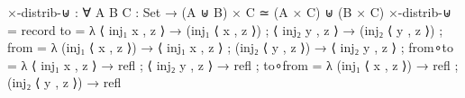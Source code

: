 \documentclass{lecturenotes}
\begin{document}
\begin{code}
×-distrib-⊎ : ∀ {A B C : Set} → (A ⊎ B) × C ≃ (A × C) ⊎ (B × C)
×-distrib-⊎ =
  record
    { to      = λ{ ⟨ inj₁ x , z ⟩ → (inj₁ ⟨ x , z ⟩)
                 ; ⟨ inj₂ y , z ⟩ → (inj₂ ⟨ y , z ⟩)
                 }
    ; from    = λ{ (inj₁ ⟨ x , z ⟩) → ⟨ inj₁ x , z ⟩
                 ; (inj₂ ⟨ y , z ⟩) → ⟨ inj₂ y , z ⟩
                 }
    ; from∘to = λ{ ⟨ inj₁ x , z ⟩ → refl
                 ; ⟨ inj₂ y , z ⟩ → refl
                 }
    ; to∘from = λ{ (inj₁ ⟨ x , z ⟩) → refl
                 ; (inj₂ ⟨ y , z ⟩) → refl
                 }
    }
\end{code}



 
\end{document}
